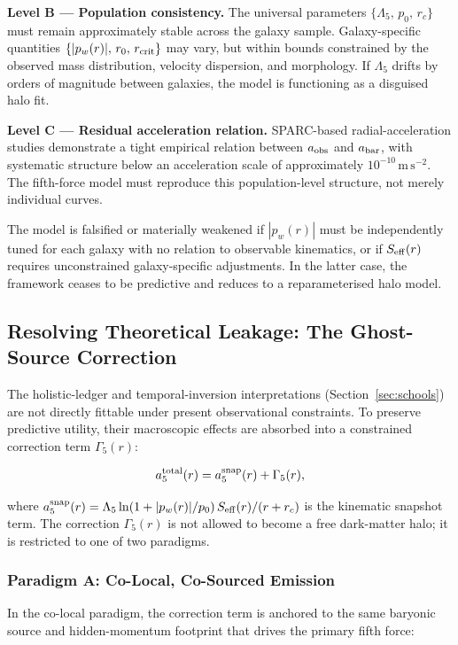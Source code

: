 \documentclass[11pt,a4paper]{article}
\newcommand{\pw}{p_w}                        %
\newcommand{\Lf}{\Lambda_5}                  %
\newcommand{\Seff}{S_{\rm eff}}              %
\newcommand{\rcrit}{r_{\rm crit}}            %
\newcommand{\aobs}{a_{\rm obs}}              %
\newcommand{\abar}{a_{\rm bar}}              %
\newcommand{\asnap}{a_5^{\rm snap}}          %
\newcommand{\atot}{a_5^{\rm total}}          %
\begin{document}
\textbf{Level B --- Population consistency.}
The universal parameters $\{\Lf,\,p_0,\,r_c\}$ must remain approximately
stable across the galaxy sample.  Galaxy-specific quantities
$\{|\pw(r)|,\,r_0,\,\rcrit\}$ may vary, but within bounds constrained by
the observed mass distribution, velocity dispersion, and morphology.  If
$\Lf$ drifts by orders of magnitude between galaxies, the model is
functioning as a disguised halo fit.

\textbf{Level C --- Residual acceleration relation.}
SPARC-based radial-acceleration studies demonstrate a tight empirical relation
between $\aobs$ and $\abar$, with systematic structure below an acceleration
scale of approximately $10^{-10}\,\mathrm{m\,s^{-2}}$.  The fifth-force
model must reproduce this population-level structure, not merely individual
curves.

The model is falsified or materially weakened if $|\pw(r)|$ must be
independently tuned for each galaxy with no relation to observable kinematics,
or if $\Seff(r)$ requires unconstrained galaxy-specific adjustments.  In the
latter case, the framework ceases to be predictive and reduces to a
reparameterised halo model.

\subsection{Resolving Theoretical Leakage: The Ghost-Source Correction}\label{sec:ghost}

The holistic-ledger and temporal-inversion interpretations
(Section~\ref{sec:schools}) are not directly fittable under present observational
constraints.  To preserve predictive utility, their macroscopic effects are
absorbed into a constrained correction term $\Gamma_5(r)$:

\[
  \atot(r) = \asnap(r) + \Gamma_5(r) ,
\]

where $\asnap(r) = \Lf\ln(1+|\pw(r)|/p_0)\,\Seff(r)/(r+r_c)$ is the
kinematic snapshot term.  The correction $\Gamma_5(r)$ is not allowed to
become a free dark-matter halo; it is restricted to one of two paradigms.

\subsubsection{Paradigm A: Co-Local, Co-Sourced Emission}

In the co-local paradigm, the correction term is anchored to the same
baryonic source and hidden-momentum footprint that drives the primary fifth
force:
\end{document}
